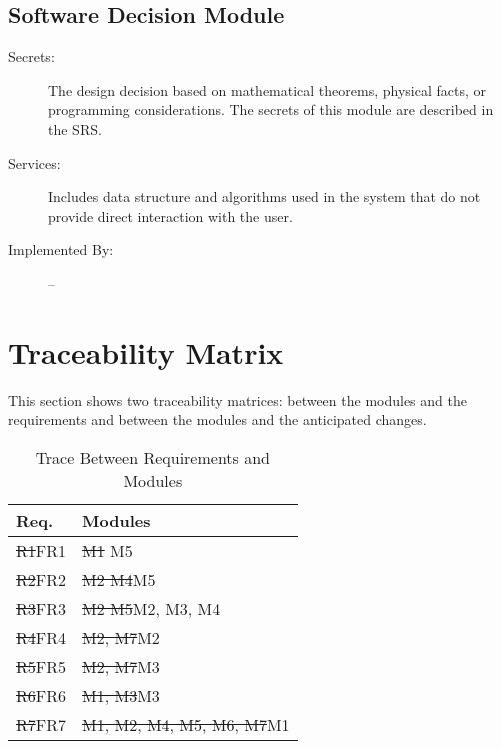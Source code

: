\documentclass[12pt, titlepage]{article}
\newcommand{\rev}[1]{\textcolor{RevisionColour}{#1}}
\begin{document}
\subsection{Software Decision Module}
\begin{description}
\item[\rev{Secrets:}] \rev{The design decision based on mathematical theorems, physical facts, or programming considerations. The secrets of this module are described in the SRS.}
\item[\rev{Services:}] Includes data structure and algorithms used in the system that
  do not provide direct interaction with the user. 
\item[Implemented By:] --
\end{description}

\section{Traceability Matrix} \label{SecTM}

This section shows two traceability matrices: between the modules and the
requirements and between the modules and the anticipated changes.

\begin{table}[H]
\centering
\begin{tabular}{p{} p{}}
\toprule
\textbf{Req.} & \textbf{Modules}\\
\midrule
\sout{R1}\rev{FR1} & \sout{M1} \rev{M5}\\
\sout{R2}\rev{FR2} & \sout{M2 M4}\rev{M5}\\
\sout{R3}\rev{FR3} & \sout{M2 M5}\rev{M2, M3, M4}\\
\sout{R4}\rev{FR4} & \sout{M2, M7}\rev{M2}\\
\sout{R5}\rev{FR5} & \sout{M2, M7}\rev{M3}\\
\sout{R6}\rev{FR6} & \sout{M1, M3}\rev{M3}\\
\sout{R7}\rev{FR7} & \sout{M1, M2, M4, M5, M6, M7}\rev{M1}\\


\bottomrule
\end{tabular}
\caption{Trace Between Requirements and Modules}
\label{TblRT}
\end{table}
\end{document}
